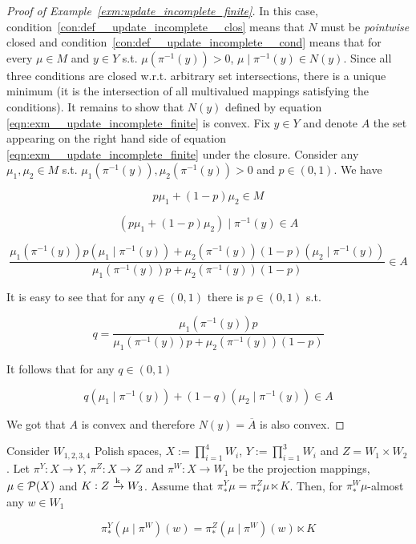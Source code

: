\begin{proof}[Proof of Example~\ref{exm:update_incomplete_finite}]

In this case, condition~\ref{con:def__update_incomplete__clos} means that $N$ must be \emph{pointwise} closed and condition~\ref{con:def__update_incomplete__cond} means that for every $\mu \in M$ and $y \in Y$ s.t. $\mu\left(\pi^{-1}(y)\right) > 0$, $\mu \mid \pi^{-1}(y) \in N(y)$. Since all three conditions are closed w.r.t. arbitrary set intersections, there is a unique minimum (it is the intersection of all multivalued mappings satisfying the conditions). It remains to show that $N(y)$ defined by equation \ref{eqn:exm__update_incomplete_finite} is convex. Fix $y \in Y$ and denote $A$ the set appearing on the right hand side of equation \ref{eqn:exm__update_incomplete_finite} under the closure. Consider any $\mu_1,\mu_2 \in M$ s.t. $\mu_1\left(\pi^{-1}(y)\right),\mu_2\left(\pi^{-1}(y)\right) > 0$ and $p \in (0,1)$. We have 

\[p\mu_1+(1-p)\mu_2 \in M\]

\[\left(p\mu_1+(1-p)\mu_2\right) \mid \pi^{-1}(y) \in A\]

\[\frac{\mu_1\left(\pi^{-1}(y)\right)p\left(\mu_1\mid \pi^{-1}(y)\right)+\mu_2\left(\pi^{-1}(y)\right)(1-p)\left(\mu_2\mid \pi^{-1}(y)\right)}{\mu_1\left(\pi^{-1}(y)\right)p+\mu_2\left(\pi^{-1}(y)\right)(1-p)} \in A\]

It is easy to see that for any $q \in (0,1)$ there is $p \in (0,1)$ s.t.

\[q = \frac{\mu_1\left(\pi^{-1}(y)\right)p}{\mu_1\left(\pi^{-1}(y)\right)p+\mu_2\left(\pi^{-1}(y)\right)(1-p)}\]

It follows that for any $q \in (0,1)$

\[q\left(\mu_1\mid \pi^{-1}(y)\right)+(1-q)\left(\mu_2\mid \pi^{-1}(y)\right) \in A\]

We got that $A$ is convex and therefore $N(y)=\overline{A}$ is also convex.
\end{proof}

\begin{samepage}
\begin{proposition}
\label{prp:four_factors}

Consider $W_{1,2,3,4}$ Polish spaces, $X:=\prod_{i=1}^4 W_i$, $Y:=\prod_{i=1}^3 W_i$ and $Z = W_1 \times W_2$. Let $\pi^Y: X \rightarrow Y$, $\pi^Z: X \rightarrow Z$ and $\pi^W: X \rightarrow W_1$ be the projection mappings, $\mu \in \mathcal{P}(X)$ and $K: Z \xrightarrow{\textnormal{k}} W_3$. Assume that $\pi^Y_* \mu = \pi^Z_*\mu \ltimes K$. Then, for $\pi^W_* \mu$-almost any $w \in W_1$

\begin{equation}
\pi^Y_* \left(\mu \mid \pi^W\right)(w) = \pi^Z_* \left(\mu \mid \pi^W\right)(w) \ltimes K
\end{equation}

\end{proposition}
\end{samepage}

